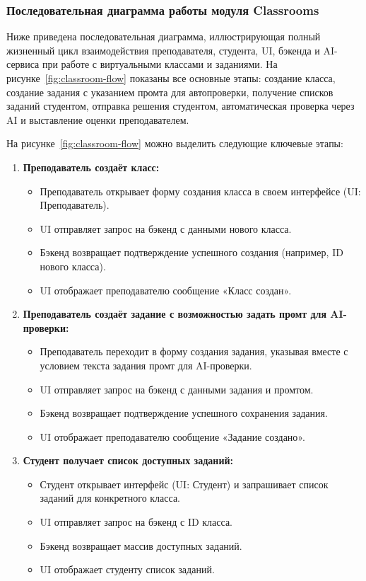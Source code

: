 \subsubsection{Последовательная диаграмма работы модуля Classrooms}
Ниже приведена последовательная диаграмма, иллюстрирующая полный жизненный цикл взаимодействия преподавателя, студента, UI, бэкенда и AI-сервиса при работе с виртуальными классами и заданиями. На рисунке~\ref{fig:classroom-flow} показаны все основные этапы: создание класса, создание задания с указанием промта для автопроверки, получение списков заданий студентом, отправка решения студентом, автоматическая проверка через AI и выставление оценки преподавателем.


На рисунке~\ref{fig:classroom-flow} можно выделить следующие ключевые этапы:

\begin{enumerate}
    \item \textbf{Преподаватель создаёт класс:}
    \begin{itemize}
        \item Преподаватель открывает форму создания класса в своем интерфейсе (UI: Преподаватель).
        \item UI отправляет запрос на бэкенд с данными нового класса.
        \item Бэкенд возвращает подтверждение успешного создания (например, ID нового класса).
        \item UI отображает преподавателю сообщение «Класс создан».
    \end{itemize}

    \item \textbf{Преподаватель создаёт задание с возможностью задать промт для AI-проверки:}
    \begin{itemize}
        \item Преподаватель переходит в форму создания задания, указывая вместе с условием текста задания промт для AI-проверки.
        \item UI отправляет запрос на бэкенд с данными задания и промтом.
        \item Бэкенд возвращает подтверждение успешного сохранения задания.
        \item UI отображает преподавателю сообщение «Задание создано».
    \end{itemize}

    \item \textbf{Студент получает список доступных заданий:}
    \begin{itemize}
        \item Студент открывает интерфейс (UI: Студент) и запрашивает список заданий для конкретного класса.
        \item UI отправляет запрос на бэкенд с ID класса.
        \item Бэкенд возвращает массив доступных заданий.
        \item UI отображает студенту список заданий.
    \end{itemize}


\end{enumerate}
